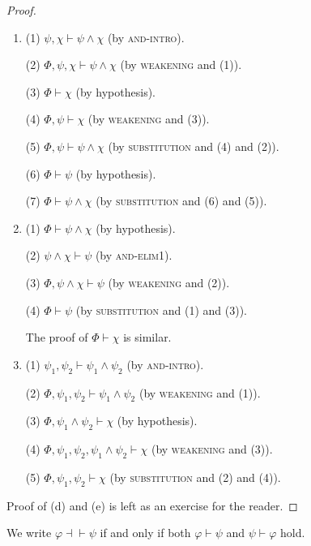 \begin{proof}
    \begin{enumerate}[itemindent=0ex, itemsep=0pt, label=\upshape{(\alph*)}]
        \item (1) $\psi,\chi\vdash\psi\wedge\chi$ (by \textsc{and-intro}). 
        
        (2) $\Phi,\psi,\chi\vdash\psi\wedge\chi$ (by \textsc{weakening} and (1)). 

        (3) $\Phi\vdash\chi$ (by hypothesis). 
        
        (4) $\Phi,\psi\vdash\chi$ (by \textsc{weakening} and (3)). 
        
        (5) $\Phi,\psi\vdash\psi\wedge\chi$ (by \textsc{substitution} and (4) and (2)). 
        
        (6) $\Phi\vdash\psi$ (by hypothesis). 
        
        (7) $\Phi\vdash\psi\wedge\chi$ (by \textsc{substitution} and (6) and (5)).
        \item (1) $\Phi\vdash\psi\wedge\chi$ (by hypothesis). 
        
        (2) $\psi\wedge\chi\vdash\psi$ (by \textsc{and-elim1}). 
        
        (3) $\Phi, \psi\wedge\chi\vdash\psi$ (by \textsc{weakening} and (2)). 
        
        (4) $\Phi\vdash\psi$ (by \textsc{substitution} and (1) and (3)). 
        
        The proof of $\Phi\vdash\chi$ is similar.
        \item (1) $\psi_1,\psi_2\vdash\psi_1\wedge\psi_2$ (by \textsc{and-intro}). 
        
        (2) $\Phi,\psi_1,\psi_2\vdash\psi_1\wedge\psi_2$ (by \textsc{weakening} and (1)). 
        
        (3) $\Phi, \psi_1\wedge\psi_2\vdash\chi$ (by hypothesis). 
        
        (4) $\Phi,\psi_1,\psi_2,\psi_1\wedge\psi_2\vdash\chi$ (by \textsc{weakening} and (3)). 
        
        (5) $\Phi,\psi_1,\psi_2\vdash\chi$ (by \textsc{substitution} and (2) and (4)).
    \end{enumerate}

    \mbox{}

    Proof of (d) and (e) is left as an exercise for the reader.
\end{proof}

\begin{definition}
    We write $\varphi\dashv\vdash\psi$ if and only if both $\varphi\vdash\psi$ and $\psi\vdash\varphi$ hold. 
\end{definition}

